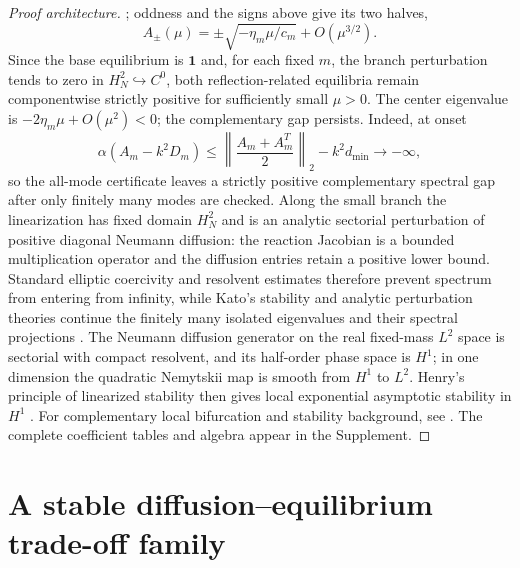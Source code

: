 \documentclass[11pt]{article}
\theoremstyle{definition}
\newcommand{\1}{\mathbf 1}
\newcommand{\alphaS}{\alpha}
\begin{document}
\begin{proof}[Proof architecture]
\cite{CrandallRabinowitz1971}; oddness and the signs above give its two halves,
\[
 A_\pm(\mu)=\pm\sqrt{-\eta_m\mu/c_m}+O(\mu^{3/2}).
\]
Since the base equilibrium is $\1$ and, for each fixed $m$, the branch
perturbation tends to zero in $H_N^2\hookrightarrow C^0$, both
reflection-related equilibria remain componentwise strictly positive for
sufficiently small $\mu>0$.
The center eigenvalue is $-2\eta_m\mu+O(\mu^2)<0$; the complementary gap
persists.  Indeed, at onset
\[
 \alphaS(A_m-k^2D_m)
 \le \left\|\frac{A_m+A_m^T}{2}\right\|_2-k^2d_{\min}
 \longrightarrow-\infty,
\]
so the all-mode certificate leaves a strictly positive complementary spectral
gap after only finitely many modes are checked.  Along the small branch the
linearization has fixed domain $H_N^2$ and is an analytic sectorial
perturbation of positive diagonal Neumann diffusion: the reaction Jacobian is
a bounded multiplication operator and the diffusion entries retain a positive
lower bound.  Standard elliptic coercivity and resolvent estimates therefore
prevent spectrum from entering from infinity, while Kato's stability and
analytic perturbation theories continue the finitely many isolated eigenvalues
and their spectral projections
\cite[Chapters~IV and~VII]{Kato1995}.  The Neumann diffusion generator on the
real fixed-mass $L^2$ space is sectorial with compact resolvent, and its
half-order phase space is $H^1$; in one dimension the quadratic Nemytskii map
is smooth from $H^1$ to $L^2$.  Henry's principle of linearized stability then
gives local exponential asymptotic stability in $H^1$
\cite[Chapter~5]{Henry1981}.  For
complementary local bifurcation and stability background, see
\cite[Chapter~I]{Kielhoefer2012}.  The complete coefficient tables and algebra
appear in the Supplement.
\end{proof}

\section{A stable diffusion--equilibrium trade-off family}
\end{document}
